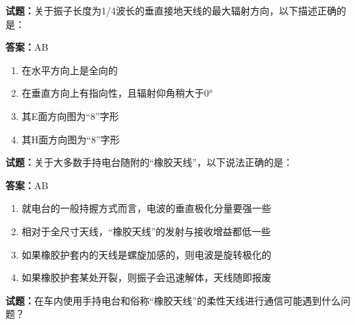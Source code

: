 \documentclass{ctexbook}
\begin{document}




\vspace{1em}

\textbf{试题：}关于振子长度为1/4波长的垂直接地天线的最大辐射方向，以下描述正确的是： 


\textbf{答案：}AB 

\begin{enumerate}[leftmargin=3em]
  \item 在水平方向上是全向的 

  \item 在垂直方向上有指向性，且辐射仰角稍大于0° 

  \item 其E面方向图为“8”字形 

  \item 其H面方向图为“8”字形 

\end{enumerate}





\vspace{1em}

\textbf{试题：}关于大多数手持电台随附的“橡胶天线”，以下说法正确的是： 

\textbf{答案：}AB 

\begin{enumerate}[leftmargin=3em]
  \item 就电台的一般持握方式而言，电波的垂直极化分量要强一些 

  \item 相对于全尺寸天线，“橡胶天线”的发射与接收增益都低一些 

  \item 如果橡胶护套内的天线是螺旋加感的，则电波是旋转极化的 

  \item 如果橡胶护套某处开裂，则振子会迅速解体，天线随即报废 

\end{enumerate}





\vspace{1em}

\textbf{试题：}在车内使用手持电台和俗称“橡胶天线”的柔性天线进行通信可能遇到什么问题？ 
\end{document}
